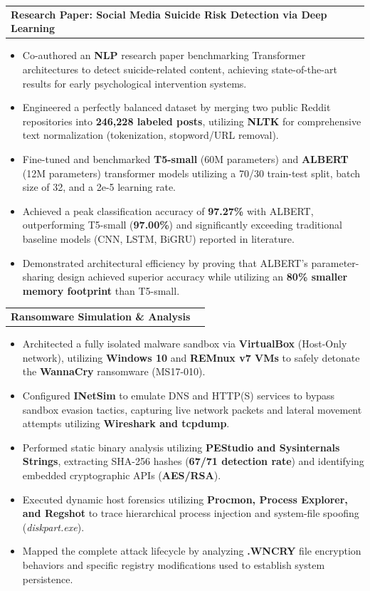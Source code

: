 \documentclass[letterpaper,11pt]{article}
\newcommand{\resumeItem}[1]{
  \item\small{
    {#1 \vspace{-4pt}}
  }
}
\newcommand{\resumeProjectHeading}[2]{
    \item
    \begin{tabularx}{0.97\textwidth}{X r}
      \textbf{#1} & #2 \\
    \end{tabularx}\vspace{-5pt}
}
\newcommand{\resumeItemListStart}{\begin{itemize}}
\newcommand{\resumeItemListEnd}{\end{itemize}\vspace{-5pt}}
\begin{document}
          \resumeProjectHeading
          {\textbf{Research Paper: Social Media Suicide Risk Detection via Deep Learning} }{}
          \resumeItemListStart
            \resumeItem{Co-authored an \textbf{NLP} research paper benchmarking Transformer architectures to detect suicide-related content, achieving state-of-the-art results for early psychological intervention systems.}
            \resumeItem{Engineered a perfectly balanced dataset by merging two public Reddit repositories into \textbf{246,228 labeled posts}, utilizing \textbf{NLTK} for comprehensive text normalization (tokenization, stopword/URL removal).}
            \resumeItem{Fine-tuned and benchmarked \textbf{T5-small} (60M parameters) and \textbf{ALBERT} (12M parameters) transformer models utilizing a 70/30 train-test split, batch size of 32, and a 2e-5 learning rate.}
            \resumeItem{Achieved a peak classification accuracy of \textbf{97.27\%} with ALBERT, outperforming T5-small (\textbf{97.00\%}) and significantly exceeding traditional baseline models (CNN, LSTM, BiGRU) reported in literature.}
            \resumeItem{Demonstrated architectural efficiency by proving that ALBERT's parameter-sharing design achieved superior accuracy while utilizing an \textbf{80\% smaller memory footprint} than T5-small.}
          \resumeItemListEnd

        \resumeProjectHeading
          {\textbf{Ransomware Simulation \& Analysis} }{}
          \resumeItemListStart
            \resumeItem{Architected a fully isolated malware sandbox via \textbf{VirtualBox} (Host-Only network), utilizing \textbf{Windows 10} and \textbf{REMnux v7 VMs} to safely detonate the \textbf{WannaCry} ransomware (MS17-010).}
            \resumeItem{Configured \textbf{INetSim} to emulate DNS and HTTP(S) services to bypass sandbox evasion tactics, capturing live network packets and lateral movement attempts utilizing \textbf{Wireshark and tcpdump}.}
            \resumeItem{Performed static binary analysis utilizing \textbf{PEStudio and Sysinternals Strings}, extracting SHA-256 hashes (\textbf{67/71 detection rate}) and identifying embedded cryptographic APIs (\textbf{AES/RSA}).}
            \resumeItem{Executed dynamic host forensics utilizing \textbf{Procmon, Process Explorer, and Regshot} to trace hierarchical process injection and system-file spoofing (\textit{diskpart.exe}).}
            \resumeItem{Mapped the complete attack lifecycle by analyzing \textbf{.WNCRY} file encryption behaviors and specific registry modifications used to establish system persistence.}
          \resumeItemListEnd
\end{document}
